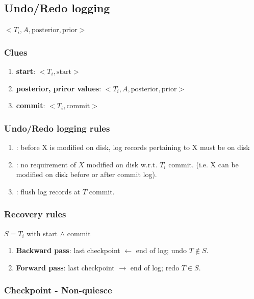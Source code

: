 \documentclass[a4paper]{report}
\begin{document}
\subsection{Undo/Redo logging}
$<T_i, A, \text{posterior}, \text{prior}>$
\subsubsection{Clues}
\begin{enumerate}
\item \textbf{start}: $<T_i, \text{start}>$
\item \textbf{posterior, priror values}: $<T_i, A, \text{posterior}, \text{prior}>$
\item \textbf{commit}: $<T_i, \text{commit}>$
\end{enumerate}

\subsubsection{Undo/Redo logging rules}
\begin{enumerate}
\item {}: before X is modified on disk, log records pertaining to X must be on disk
\item {}: no requirement of $X$ modified on disk w.r.t. $T_i$ commit. (i.e. X can be modified on disk before or after commit log).
\item {}: flush log records at $T$ commit. 
\end{enumerate}

\subsubsection{Recovery rules}
$S = T_i$ with start $\wedge$ commit
\begin{enumerate}
\item \textbf{Backward pass}: last checkpoint $\leftarrow$ end of log; undo $T \notin S$.
\item \textbf{Forward pass}: last checkpoint $\rightarrow$ end of log; redo $T \in S$.
\end{enumerate}

\subsubsection{Checkpoint - Non-quiesce}
\end{document}
